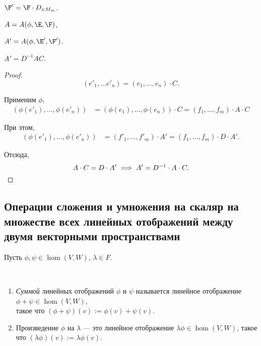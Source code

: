 $\F' = \F \cdot D_{\in M_m}$.

$A = A(\phi, \E, \F)$,

$A' = A(\phi, \E', \F')$.

\begin{proposal}
    $A' = D^{-1} A C$.
\end{proposal}

\begin{proof}
    \begin{equation*}
        (e'_1, \dots e'_n) = (e_1, \dots, e_n) \cdot C
    .\end{equation*}
    
    Применим $\phi$, 
    \begin{align*}
        (\phi(e'_1), \dots, \phi(e'_n)) &= (\phi(e_1), \dots, \phi(e_n)) \cdot C = (f_1, \dots, f_m) \cdot A \cdot C
    \end{align*}
    
    При этом,
    \begin{align*}
        (\phi(e'_1), \dots, \phi(e'_n)) &= (f'_1, \dots, f'_m) \cdot A' = (f_1, \dots, f_m) \cdot D \cdot A'
    .\end{align*}

    Отсюда,
    \begin{equation*}
        A \cdot C = D \cdot A' \implies A' = D^{-1} \cdot A \cdot C
    .\qedhere\end{equation*}
\end{proof}


\subsection{Операции сложения и умножения на скаляр на множестве всех линейных отображений между двумя векторными пространствами}

Пусть $\phi, \psi \in \hom(V, W)$, $\lambda \in F$.

\begin{definition}~
    \begin{enumerate}
    \item \textit{Суммой} линейных отображений $\phi$ и $\psi$ называется линейное отображение $\phi + \psi \in \hom(V, W)$, \\ такое что ${(\phi + \psi)(v) := \phi(v) + \psi(v)}$.
    \item Произведение $\phi$ на $\lambda$ --- это линейное отображение $\lambda \phi \in \hom(V, W)$, такое что $(\lambda\phi)(v) := \lambda \phi(v)$.
    \end{enumerate}
\end{definition}

